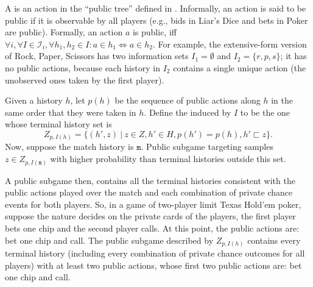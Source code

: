 \documentclass{aamas2015}
\newcommand{\cI}{\mathcal{I}}
\newcommand{\ttm}{\mathtt{m}}
\newcommand{\defword}[1]{\textbf{\boldmath{#1}}}
\begin{document}
A \defword{public action} is an action in the ``public tree'' defined in \cite{12aamas-pcs}. Informally, an action is said to be public if it is observable by all players (e.g., bids in Liar's Dice and bets in Poker are public). Formally, an action $a$ is public, iff 
$\forall i, \forall I \in \cI_i, \forall h_1,h_2\in I: a\in h_1 \Leftrightarrow a\in h_2$.
For example, the extensive-form version of Rock, Paper, Scissors has two information 
sets $I_1 = \emptyset$ and $I_2 = \{ r, p, s \}$; it has no public actions, because each history in 
$I_2$ contains a single unique action (the unobserved ones taken by the first player).  

Given a history $h$, let $p(h)$ be the sequence of public actions along $h$ in the same order that they were taken in $h$. 
Define the \defword{public subgame} induced by $I$ to be the one whose terminal history set is
\[Z_{p,I(h)} = \{(h',z)~|~z \in Z, h' \in H, p(h') = p(h), h' \sqsubset z \}.\]
Now, suppose the match history is $\ttm$.
Public subgame targeting samples $z \in Z_{p,I(\ttm)}$ with higher probability than terminal histories outside this set.

A public subgame then, contains all the terminal histories consistent with the public actions played over the match and
each combination of private chance events for both players. So, in a game of two-player limit Texas Hold'em poker, suppose the nature decides on the private cards of the players,
the first player bets one chip and the second player calls. At this point, the public actions are: bet one chip and call. 
The public subgame described by $Z_{p,I(h)}$ contains every terminal history (including every combination of private chance 
outcomes for all players) with at least two public actions, whose first two public actions are: bet one chip and call.  
\end{document}
